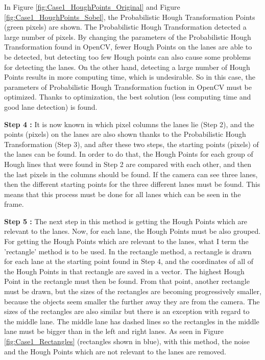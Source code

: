 In Figure \ref{fig:Case1_HoughPoints_Original} and Figure \ref{fig:Case1_HoughPoints_Sobel}, the Probabilistic Hough Transformation Points (green pixels) are shown. The Probabilistic Hough Transformation detected a large number of pixels. By changing the parameters of the Probabilistic Hough Transformation found in OpenCV, fewer Hough Points on the lanes are able to be detected, but detecting too few Hough points can also cause some problems for detecting the lanes. On the other hand, detecting a large number of Hough Points results in more computing time, which is undesirable. So in this case, the parameters of Probabilistic Hough Transformation fuction in OpenCV must be optimized. Thanks to optimization, the best solution (less computing time and good lane detection) is found.

\textbf{Step 4 : }It is now known in which pixel columns the lanes lie (Step 2), and the points (pixels) on the lanes are also shown thanks to the Probabilistic Hough Transformation (Step 3), and after these two steps, the starting points (pixels) of the lanes can be found. In order to do that, the Hough Points for each group of Hough lines that were found in Step 2 are compared with each other, and then the last pixels in the columns should be found. If the camera can see three lanes, then the different starting points for the three different lanes must be found. This means that this process must be done for all lanes which can be seen in the frame.


\textbf{Step 5 : }The next step in this method is getting the Hough Points which are relevant to the lanes. Now, for each lane, the Hough Points must be also grouped. For getting the Hough Points which are relevant to the lanes, what I term the 'rectangle' method is to be used. In the rectangle method, a rectangle is drawn for each lane at the starting point found in Step 4, and the coordinates of all of the Hough Points in that rectangle are saved in a vector. The highest Hough Point in the rectangle must then be found. From that point, another rectangle must be drawn, but the sizes of the rectangles are becoming progressively smaller, because the objects seem smaller the further away they are from the camera. The sizes of the rectangles are also similar but there is an exception with regard to the middle lane. The middle lane has dashed lines so the rectangles in the middle lane must be bigger than in the left and right lanes. As seen in Figure \ref{fig:Case1_Rectangles} (rectangles shown in blue), with this method, the noise and the Hough Points which are not relevant to the lanes are removed.


